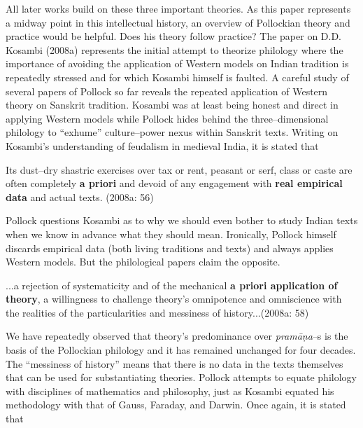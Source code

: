 \vspace{-.2cm}

All later works build on these three important theories. As this paper represents a midway point in this intellectual history, an overview of Pollockian theory and practice would be helpful. Does his theory follow practice? The paper on D.D. Kosambi (2008a) represents the initial attempt to theorize philology where the importance of avoiding the application of Western models on Indian tradition is repeatedly stressed and for which Kosambi himself is faulted. A careful study of several papers of Pollock so far reveals the repeated application of Western theory on Sanskrit tradition. Kosambi was at least being honest and direct in applying Western models while Pollock hides behind the three–dimensional philology to “exhume” culture–power nexus within Sanskrit texts. Writing on Kosambi’s understanding of feudalism in medieval India, it is stated that

\begin{myquote}
Its dust–dry shastric exercises over tax or rent, peasant or serf, class or caste are often completely \textbf{a priori} and devoid of any engagement with \textbf{real empirical data} and actual texts. (2008a: 56)
\end{myquote}

Pollock questions Kosambi as to why we should even bother to study Indian texts when we know in advance what they should mean. Ironically, Pollock himself discards empirical data (both living traditions and texts) and always applies Western models. But the philological papers claim the opposite.

\begin{myquote}
...a rejection of systematicity and of the mechanical \textbf{a priori application of theory}, a willingness to challenge theory’s omnipotence and omniscience with the realities of the particularities and messiness of history...(2008a: 58)
\end{myquote}

We have repeatedly observed that theory’s predominance over \textit{pramāṇa}–s is the basis of the Pollockian philology and it has remained unchanged for four decades. The “messiness of history” means that there is no data in the texts themselves that can be used for substantiating theories. Pollock attempts to equate philology with disciplines of mathematics and philosophy, just as Kosambi equated his methodology with that of Gauss, Faraday, and Darwin. Once again, it is stated that

